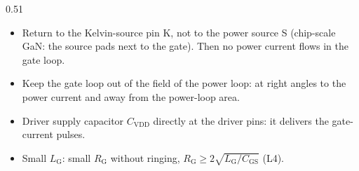 \begin{frame}
\begin{columns}[T]
\begin{column}{0.51\textwidth}
\begin{itemize}
				\item Return to the Kelvin-source pin K, not to the power source S (chip-scale GaN: the source pads next to the gate). Then no power current flows in the gate loop.
				\item Keep the gate loop out of the field of the power loop: at right angles to the power current and away from the power-loop area.
				\item Driver supply capacitor $C_\mathrm{VDD}$ directly at the driver pins: it delivers the gate-current pulses.
				\item Small $L_\mathrm{G}$: small $R_\mathrm{G}$ without ringing, $R_\mathrm{G}\geq2\sqrt{L_\mathrm{G}/C_\mathrm{GS}}$ (L4).
			\end{itemize}
		\end{column}
	\end{columns}
\end{frame}

